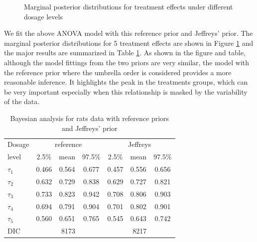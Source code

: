 \documentclass[Proceedings]{ascelike}
\begin{document}
\begin{figure}[h!]
\centering
{}
\caption{Marginal posterior distributions for treatment effects under different dosage levels}
\label{fig:rats}
\end{figure}
We fit the above ANOVA model with this reference prior and Jeffreys' prior. The marginal posterior distributions for 5 treatment effects are shown in Figure \ref{fig:rats} and the major results are summarized in Table \ref{tab:rat_mcmc}. As shown in the figure and table, although the model fittings from the two priors are very similar, the model with the reference prior where the umbrella order is considered provides a more reasonable inference. It highlights the peak in the treatments groups, which can be very important especially when this relationship is masked by the variability of the data.
\begin{table}[h!]
  \centering
  \caption{Bayesian analysis for rats data with reference priors and Jeffreys' prior}
\begin{tabular}{|l|c|c|c|c|c|c|}
    \hline
Dosage &\multicolumn{3}{|c|}{reference}&\multicolumn{3}{|c|}{Jeffreys}\\
\cline{2-7}
level & 2.5\% & mean & 97.5\% & 2.5\% & mean & 97.5\%  \\
\hline
$\tau_1$ & 0.466 & 0.564 &  0.677 & 0.457 & 0.556 &  0.656 \\
$\tau_2$ & 0.632 & 0.729 & 0.838 & 0.629 & 0.727 & 0.821   \\
$\tau_3$ & 0.733 & 0.823 & 0.942 & 0.708 & 0.806 & 0.903  \\
$\tau_4$ & 0.694 & 0.791 & 0.904 & 0.701 & 0.802 & 0.901  \\
$\tau_5$ & 0.560 & 0.651 & 0.765 & 0.545 & 0.643 & 0.742  \\
\hline
DIC& \multicolumn{3}{|c|}{8173} &\multicolumn{3}{|c|}{8217}\\
\hline
\end{tabular}
\label{tab:rat_mcmc}
\end{table}
\end{document}
